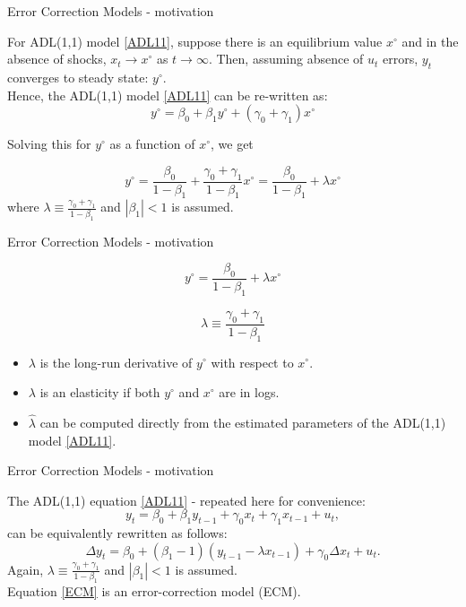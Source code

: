 \documentclass[usenames,dvipsnames]{beamer}
\begin{document}
\begin{frame}{Error Correction Models - motivation}

For ADL(1,1) model \eqref{ADL11}, suppose there is an equilibrium value $x^{\circ}$ and in the absence of shocks, $x_t \rightarrow x^{\circ}$ as $t \rightarrow \infty$. Then, assuming absence of $u_t$ errors, $y_t$ converges to steady state: $y^{\circ}$.\\ 
\medskip
Hence, the ADL(1,1) model \eqref{ADL11} can be re-written as:
$$y^{\circ} = \beta_0 + \beta_1 y^{\circ} + (\gamma_0 + \gamma_1) x^{\circ}$$

Solving this for $y^{\circ}$ as a function of $x^{\circ}$, we get

$$ y^{\circ} = 
   \frac{\beta_0}{1 - \beta_1} + \frac{\gamma_0 + \gamma_1}{1 - \beta_1} x^{\circ} = 
   \frac{\beta_0}{1 - \beta_1} + \lambda x^{\circ}$$
where $ \lambda \equiv \frac{\gamma_0 + \gamma_1}{1 - \beta_1}$ and $|\beta_1|<1$ is assumed. \\


\end{frame}
\begin{frame}{Error Correction Models - motivation}

$$ y^{\circ} =  \frac{\beta_0}{1 - \beta_1} + \lambda x^{\circ}$$

$$ \lambda \equiv \frac{\gamma_0 + \gamma_1}{1 - \beta_1}$$

\begin{itemize}
\item $\lambda$ is the long-run derivative of $y^{\circ}$ with respect to $x^{\circ}$.
\medskip
\item $\lambda$ is an elasticity if both $y^{\circ}$ and $x^{\circ}$ are in logs.
\medskip
\item $\hat{\lambda}$ can be computed directly from the estimated parameters of the ADL(1,1) model \eqref{ADL11}.
\end{itemize}


\end{frame}
\begin{frame}{Error Correction Models - motivation}

The ADL(1,1) equation \eqref{ADL11} - repeated here for convenience:
\begin{equation*}
y_t = \beta_0 + \beta_1 y_{t-1} + 
         \gamma_0 x_t + \gamma_1 x_{t-1} + u_t,
\end{equation*}
can be equivalently rewritten as follows:
\begin{equation} \label{ECM}
\Delta y_t = \beta_0 + (\beta_1 -1) ( y_{t-1} - \lambda x_{t-1} ) + 
         \gamma_0 \Delta x_t + u_t.
\end{equation}
Again, $ \lambda \equiv \frac{\gamma_0 + \gamma_1}{1 - \beta_1}$ and $|\beta_1| < 1$ is assumed. \\
\medskip
Equation \eqref{ECM} is an error-correction model (ECM).
\end{frame}
\end{document}
